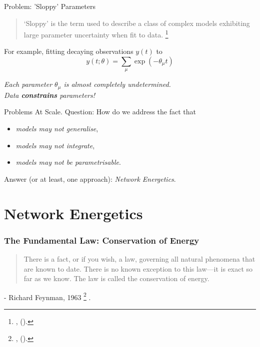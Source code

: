 \documentclass[11pt,reqno]{beamer}
\newcommand{\fcite}[1]{
\footnote{\tiny\cite{#1}, (\citeyear{#1}).}
}
\begin{document}
\begin{frame}{Problem: 'Sloppy' Parameters}
\begin{block}{}
\begin{quote}`Sloppy' is the term used to describe a class of complex models exhibiting large
parameter uncertainty when fit to data.\fcite{Transtrum2015}
\end{quote}

\end{block}

\vfill

For example, fitting decaying observations $y(t)$ to
\[
y(t;\theta) = \sum_\mu \exp(-\theta_\mu t) 
\]
\begin{center}
\emph{Each parameter $\theta_\mu$ is almost completely undetermined.}\\
\emph{Data {\bf constrains} parameters!}
\end{center}
\end{frame}
\begin{frame}{Problems At Scale.}
Question: How do we address the fact that
\begin{itemize}
	\item \emph{models may not generalise},
	\item \emph{models may not integrate},
	\item \emph{models may not be parametrisable}.
\end{itemize}
\vfill
\pause
Answer (or at least, one approach): \emph{Network Energetics}.
\end{frame}

\section{Network Energetics}

\begin{frame}
\frametitle{The Fundamental Law: Conservation of Energy}
\begin{quotation}
There is a fact, or if you wish, a law, governing all natural phenomena that are known to date. There is no known exception to this law—it is exact so far as we know.
The law is called the conservation of energy.
\end{quotation}

\vspace{10pt}
- Richard Feynman, 1963\fcite{Feynman1963}.
\end{frame}
\end{document}
